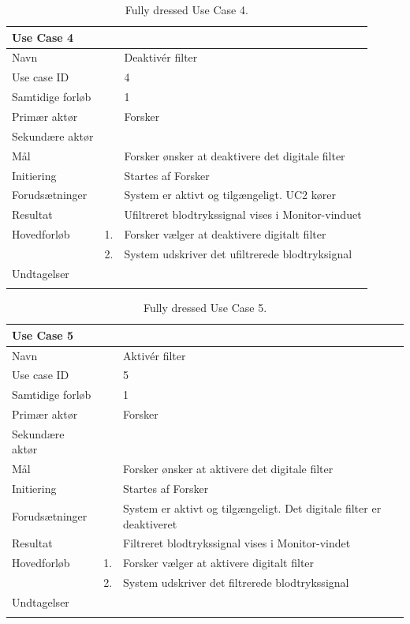 \begin{longtabu} to  %
    {\large \textbf{Use Case 4}} && \\
    \toprule
    Navn &&    Deaktivér filter\\
    Use case ID &&    4\\
    Samtidige forløb &&   1\\
    Primær aktør &&    Forsker\\
    Sekundære aktør &&	 \\
    Mål &&    Forsker ønsker at deaktivere det digitale filter\\
    Initiering &&	Startes af Forsker\\
    Forudsætninger &&  System er aktivt og tilgængeligt. UC2 kører  \\
    Resultat &&		Ufiltreret blodtrykssignal vises i Monitor-vinduet                 \\ \midrule
    Hovedforløb &    1. &    Forsker vælger at deaktivere digitalt filter \\[-1ex]   						 	
                &    2. &    System udskriver det ufiltrerede blodtryksignal\newline\\ \midrule
                
    Undtagelser &     &      \\ \bottomrule
\caption{Fully dressed Use Case 4.}
\label{UC4}
\end{longtabu}


\begin{longtabu} to  %
    {\large \textbf{Use Case 5}} && \\
    \toprule
    Navn &&    Aktivér filter\\
    Use case ID &&    5\\
    Samtidige forløb &&   1\\
    Primær aktør &&    Forsker\\
    Sekundære aktør &&	 \\
    Mål &&    Forsker ønsker at aktivere det digitale filter\\
    Initiering &&	Startes af Forsker\\
    Forudsætninger &&  System er aktivt og tilgængeligt. Det digitale filter er deaktiveret  \\
    Resultat &&		Filtreret blodtrykssignal vises i Monitor-vindet                 \\ \midrule
    Hovedforløb &    1. &    Forsker vælger at aktivere digitalt filter\\[-1ex]   						 	
                &    2. &    System udskriver det filtrerede blodtrykssignal\newline\\ \midrule
                
    Undtagelser &     &      \\ \bottomrule
\caption{Fully dressed Use Case 5.}
\label{UC5}
\end{longtabu}
    
